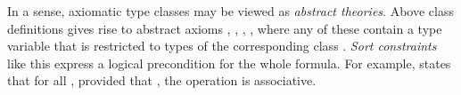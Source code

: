 \begin{isabellebody}
\begin{isamarkuptext}
\end{isamarkuptext}%
\isamarkuptrue%
%
\isamarkuptrue%
%
\begin{isamarkuptext}%
In a sense, axiomatic type classes may be viewed as \emph{abstract
  theories}.  Above class definitions gives rise to abstract axioms
  , , , , where any of these contain a type variable  that is restricted to types of the corresponding class .  \emph{Sort constraints} like this express a logical
  precondition for the whole formula.  For example, 
  states that for all \isa{{\isasymtau}}, provided that , the operation \isa{{\isasymodot}\ {\isasymColon}\ {\isasymtau}\ {\isasymRightarrow}\ {\isasymtau}\ {\isasymRightarrow}\ {\isasymtau}} is associative.


\end{isamarkuptext}
\end{isabellebody}

